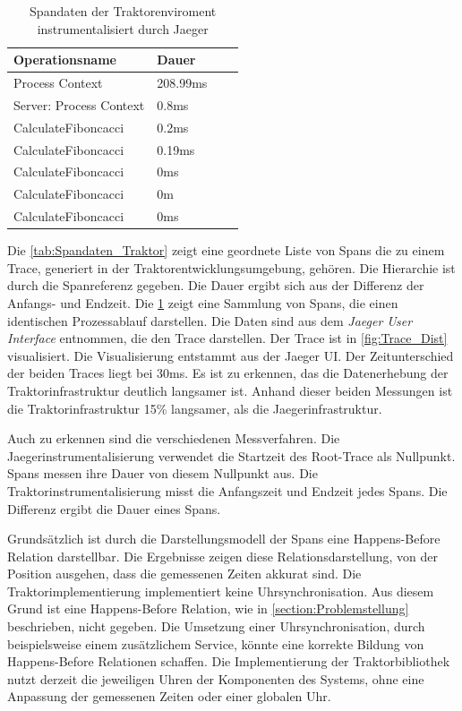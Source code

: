 \begin{table}[]
	\centering
	\begin{tabular}{|l|l|l|l|}
		\hline
		Operationsname          & Dauer 	\\ \hline
		Process Context         & 208.99ms  \\ \hline
		Server: Process Context & 0.8ms 	\\ \hline
		CalculateFiboncacci     & 0.2ms 	\\ \hline
		CalculateFiboncacci     & 0.19ms 	\\ \hline
		CalculateFiboncacci     & 0ms		\\ \hline
		CalculateFiboncacci     & 0m		\\ \hline
		CalculateFiboncacci     & 0ms		\\ \hline
	\end{tabular}
	\caption{Spandaten der Traktorenviroment instrumentalisiert durch Jaeger}
	\label{tab:Spandaten_Jaeger}
\end{table}
Die \cref{tab:Spandaten_Traktor} zeigt eine geordnete Liste von Spans die zu einem Trace, generiert in der Traktorentwicklungsumgebung, gehören. Die Hierarchie ist durch die Spanreferenz gegeben. Die Dauer ergibt sich aus der Differenz der Anfangs- und Endzeit. Die \cref{tab:Spandaten_Jaeger} zeigt eine Sammlung von Spans, die einen identischen Prozessablauf darstellen. Die Daten sind aus dem \emph{Jaeger User Interface} entnommen, die den Trace darstellen. Der Trace ist in \cref{fig:Trace_Dist} visualisiert. Die Visualisierung entstammt aus der Jaeger UI.
Der Zeitunterschied der beiden Traces liegt bei 30ms. Es ist zu erkennen, das die Datenerhebung der Traktorinfrastruktur deutlich langsamer ist. Anhand dieser beiden Messungen ist die Traktorinfrastruktur 15\% langsamer, als die Jaegerinfrastruktur.

Auch zu erkennen sind die verschiedenen Messverfahren. Die Jaegerinstrumentalisierung verwendet die Startzeit des Root-Trace als Nullpunkt. Spans messen ihre Dauer von diesem Nullpunkt aus. Die Traktorinstrumentalisierung misst die Anfangszeit und Endzeit jedes Spans. Die Differenz ergibt die Dauer eines Spans.

Grundsätzlich ist durch die Darstellungsmodell der Spans eine Happens-Before Relation darstellbar. Die Ergebnisse zeigen diese Relationsdarstellung, von der Position ausgehen, dass die gemessenen Zeiten akkurat sind.  Die Traktorimplementierung implementiert keine Uhrsynchronisation. Aus diesem Grund ist eine Happens-Before Relation, wie in \cref{section:Problemstellung} beschrieben, nicht gegeben. Die Umsetzung einer Uhrsynchronisation, durch beispielsweise einem zusätzlichem Service, könnte eine korrekte Bildung von Happens-Before Relationen schaffen. Die Implementierung der Traktorbibliothek nutzt derzeit die jeweiligen Uhren der Komponenten des Systems, ohne eine Anpassung der gemessenen Zeiten oder einer globalen Uhr.

